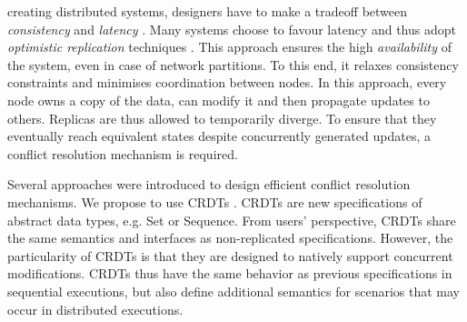 \documentclass[10pt,journal,compsoc]{IEEEtran}
\begin{document}
%
\IEEEpeerreviewmaketitle

%
%
%
%
 creating distributed systems, designers have to make a tradeoff between \emph{consistency} and \emph{latency} \cite{pacelc2012}.
Many systems choose to favour latency and thus adopt \emph{optimistic replication} techniques \cite{10.1145/1057977.1057980}.
This approach ensures the high \emph{availability} of the system, even in case of network partitions.
To this end, it relaxes consistency constraints and minimises coordination between nodes.
In this approach, every node owns a copy of the data, can modify it and then propagate updates to others.
Replicas are thus allowed to temporarily diverge.
To ensure that they eventually reach equivalent states despite concurrently generated updates, a conflict resolution mechanism is required.

Several approaches were introduced to design efficient conflict resolution mechanisms.
We propose to use \acfp{CRDT} \cite{shapiro_2011_crdt}.
\acp{CRDT} are new specifications of abstract data types, e.g. Set or Sequence.
From users' perspective, \acp{CRDT} share the same semantics and interfaces as non-replicated specifications.
However, the particularity of \acp{CRDT} is that they are designed to natively support concurrent modifications.
\acp{CRDT} thus have the same behavior as previous specifications in sequential executions, but also define additional semantics for scenarios that may occur in distributed executions.
\end{document}
